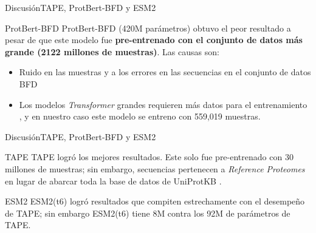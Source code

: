 \documentclass[10pt]{beamer}
\newcommand{\1}{
	\setbeamertemplate{background}{
		\texttt{[image: img/1]}
		\tikz[overlay] \fill[fill opacity=0.75,fill=white] (0,0) rectangle (-\paperwidth,\paperheight);
	}
}
\begin{document}
	


\begin{frame}{Discusión}{TAPE, ProtBert-BFD y ESM2}
	
	\begin{block}{ProtBert-BFD}
		ProtBert-BFD (420M parámetros) obtuvo el peor resultado a pesar de que este modelo fue \textbf{pre-entrenado con el conjunto de datos más grande (2122 millones de muestras)}. Las causas son: 
	\end{block}

	\begin{block}{}
		\begin{itemize}
			\item  Ruido en las muestras y a los errores en las secuencias en el conjunto de datos BFD \cite{elnaggar2021prottrans}
			\item Los modelos \textit{Transformer} grandes requieren más datos para el entrenamiento \cite{elnaggar2021prottrans}, y en nuestro caso este modelo se entreno con 559,019 muestras.
		\end{itemize}
	\end{block}
	
\end{frame}



\begin{frame}{Discusión}{TAPE, ProtBert-BFD y ESM2}
	
	\begin{block}{TAPE}
		TAPE logró los mejores resultados. Este solo fue pre-entrenado con 30 millones de muestras; sin embargo, secuencias pertenecen a \textit{Reference Proteomes} en lugar de abarcar toda la base de datos de UniProtKB \cite{finn2016pfam}. 
	\end{block}
	
	\begin{block}{ESM2}
		ESM2(t6) logró resultados que compiten estrechamente con el desempeño de TAPE; sin embargo ESM2(t6) tiene 8M contra los 92M de parámetros de TAPE.		
	\end{block}
\end{frame}
\end{document}
